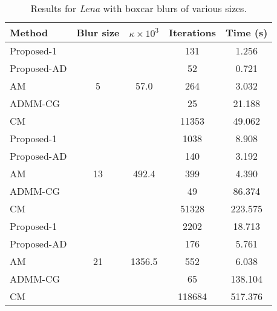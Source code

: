 \documentclass[10pt,twocolumn,twoside]{IEEEtran}
\begin{document}
\begin{table}[h]
	\renewcommand{\arraystretch}{1}
	\caption{Results for \textit{Lena} with boxcar blurs of various sizes.}
	\centering
\begin{tabular}{l|c|c|c|c}
Method &Blur size &$\kappa \times 10^3$ &Iterations &Time (s) \\
\hline
Proposed-1 & \multirow{5}{*}{5} & \multirow{5}{*}{57.0} &  131 & 1.256  \\
Proposed-AD & & &   52 & 0.721 \\
AM & & &  264 & 3.032 \\
ADMM-CG & & &   25 & 21.188 \\
CM & & & 11353 & 49.062 \\
\hline
Proposed-1 & \multirow{5}{*}{13} & \multirow{5}{*}{492.4} & 1038 & 8.908  \\
Proposed-AD & & &  140 & 3.192 \\
AM & & &  399 & 4.390 \\
ADMM-CG & & &   49 & 86.374 \\
CM & & & 51328 & 223.575 \\
\hline
Proposed-1 & \multirow{5}{*}{21} & \multirow{5}{*}{1356.5} & 2202 & 18.713  \\
Proposed-AD & & &  176 & 5.761 \\
AM & & &  552 & 6.038 \\
ADMM-CG & & &   65 & 138.104 \\
CM & & & 118684 & 517.376 \\
\hline
\end{tabular}
\end{table}
\end{document}

